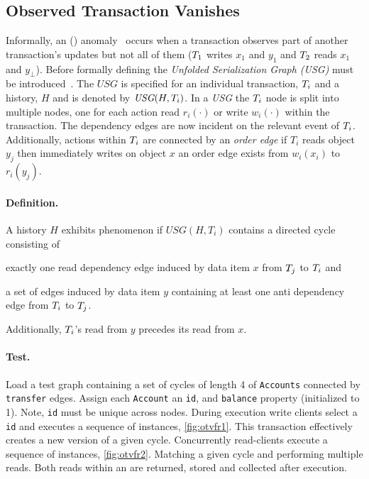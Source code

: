 \subsection{Observed Transaction Vanishes}
\label{sec:observ-trans-vanish}

Informally, an  () 
anomaly~\cite{DBLP:journals/pvldb/BailisDFGHS13} occurs when a transaction 
observes part of another transaction's updates but not all of them 
(\eg $T_1$ writes $x_1$ and $y_1$ and $T_2$ reads $x_1$ and $y_\bot$).
Before formally defining  the \emph{Unfolded Serialization Graph (USG)} 
must be introduced~\cite{adya1999weak}. The $\textit{USG}$ is specified for an 
individual transaction, $T_i$ and a history, $H$ and is denoted by 
$\textit{USG}(H,T_i)$. In a \emph{USG} the $T_i$ node is split into 
multiple nodes, one for each action read $r_i(\cdot)$ or  write $w_i(\cdot)$  
within the transaction. The dependency edges are now incident on the relevant 
event of $T_i$. Additionally, actions within $T_i$ are connected by 
an \emph{order edge} \eg if $T_i$ reads object $y_j$ then immediately writes on 
object $x$ an order edge exists from $w_i(x_i)$ to $r_i(y_j)$.

\paragraph{Definition.}
A history $H$ exhibits phenomenon  if $\textit{USG}(H,T_i)$ 
contains a directed cycle consisting of 
\begin{enumerate*}[label={(\roman*)}]
  \item exactly one read dependency edge induced by data item $x$ from 
        $T_j$ to $T_i$ and
  \item a set of edges induced by data item $y$ containing at least one anti 
        dependency edge from $T_i$ to $T_j$.
\end{enumerate*}
Additionally, $T_i$'s read from $y$ precedes its read from $x$.

\paragraph{Test.}
Load a test graph containing a set of cycles of length 4 of \texttt{Accounts} 
connected by \texttt{transfer} edges. Assign each \texttt{Account} an \texttt{id}, 
and \texttt{balance} property (initialized to 1). Note, \texttt{id} must be 
unique across nodes. During execution write clients select a \texttt{id} and 
executes a sequence of  instances, \autoref{fig:otvfr1}.
This transaction effectively creates a new version of a given cycle. Concurrently 
read-clients execute a sequence of  instances, \autoref{fig:otvfr2}.
Matching a given cycle and performing multiple reads. Both reads within an 
 are returned, stored and collected after execution.

